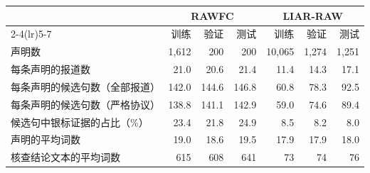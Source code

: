 \begin{tabular}{lrrrrrr}
\toprule
 & \multicolumn{3}{c}{RAWFC} & \multicolumn{3}{c}{LIAR-RAW} \\
\cmidrule(lr){2-4}\cmidrule(lr){5-7}
 & 训练 & 验证 & 测试 & 训练 & 验证 & 测试 \\
\midrule
声明数 & 1,612 & 200 & 200 & 10,065 & 1,274 & 1,251 \\
每条声明的报道数 & 21.0 & 20.6 & 21.4 & 11.4 & 14.3 & 17.1 \\
每条声明的候选句数（全部报道） & 142.0 & 144.6 & 146.8 & 60.8 & 78.3 & 92.5 \\
每条声明的候选句数（严格协议） & 138.8 & 141.1 & 142.9 & 59.0 & 74.6 & 89.4 \\
候选句中银标证据的占比（\%） & 23.4 & 21.8 & 24.9 & 8.5 & 8.2 & 8.0 \\
声明的平均词数 & 19.0 & 18.6 & 19.5 & 17.9 & 17.9 & 18.0 \\
核查结论文本的平均词数 & 615 & 608 & 641 & 73 & 74 & 76 \\
\bottomrule
\end{tabular}
